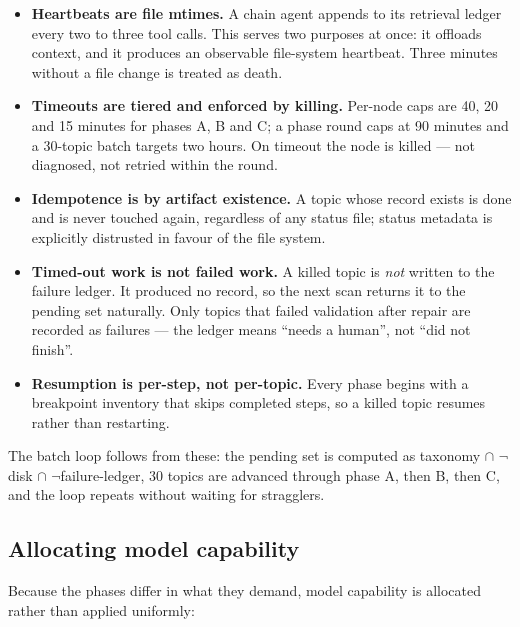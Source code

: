 \documentclass[10pt,a4paper]{article}
\begin{document}
\begin{itemize}[leftmargin=1.4em,itemsep=2pt]
\item \textbf{Heartbeats are file mtimes.} A chain agent appends to its retrieval
  ledger every two to three tool calls. This serves two purposes at once: it
  offloads context, and it produces an observable file-system heartbeat. Three
  minutes without a file change is treated as death.
\item \textbf{Timeouts are tiered and enforced by killing.} Per-node caps are 40,
  20 and 15 minutes for phases A, B and C; a phase round caps at 90 minutes and a
  30-topic batch targets two hours. On timeout the node is killed --- not
  diagnosed, not retried within the round.
\item \textbf{Idempotence is by artifact existence.} A topic whose record exists
  is done and is never touched again, regardless of any status file; status
  metadata is explicitly distrusted in favour of the file system.
\item \textbf{Timed-out work is not failed work.} A killed topic is \emph{not}
  written to the failure ledger. It produced no record, so the next scan returns
  it to the pending set naturally. Only topics that failed validation after
  repair are recorded as failures --- the ledger means ``needs a human'', not
  ``did not finish''.
\item \textbf{Resumption is per-step, not per-topic.} Every phase begins with a
  breakpoint inventory that skips completed steps, so a killed topic resumes
  rather than restarting.
\end{itemize}

\noindent The batch loop follows from these: the pending set is computed as
taxonomy $\cap$ $\neg$disk $\cap$ $\neg$failure-ledger, 30 topics are advanced
through phase A, then B, then C, and the loop repeats without waiting for
stragglers.

\subsection{Allocating model capability}
\label{sec:models}

Because the phases differ in what they demand, model capability is allocated
rather than applied uniformly:
\end{document}
